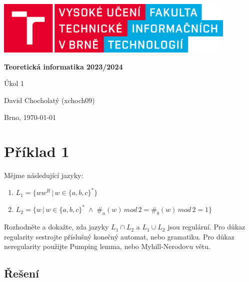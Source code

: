 \documentclass[a4paper, 12pt]{article}
\theoremstyle{definition}
\theoremstyle{definition}
\theoremstyle{definition}
\theoremstyle{remark}
\begin{document}
    \begin{titlepage}
        \begin{center}
            \includegraphics[width=0.87\textwidth]{logo_cz.png}
            \vspace*{6cm}

            \Huge{\textbf{Teoretická informatika 2023/2024}}
            \vspace{0.5cm}
            
            \LARGE{Úkol 1}
            \vspace{1cm}
            
            \Large{David Chocholatý (xchoch09)}
            
           \vfill
		   \begin{flushright} 
		   Brno, \today
		   \end{flushright}
        \end{center}
    \end{titlepage}

\pagestyle{fancy}

\section{Příklad 1}
Mějme následující jazyky:

\begin{enumerate}[label=(\alph*)]
    \item $L_1 = \{ww^R \, | \, w \in \{a,b,c\}^\ast\}$
    \item $L_2 = \{w \, | \, w \in \{a,b,c\}^\ast \; \wedge \; \#_a(w) \, mod \, 2 = \#_b(w) \, mod \, 2 = 1\}$
\end{enumerate}

Rozhodněte a dokažte, zda jazyky $L_1 \cap L_2$ a $L_1 \cup L_2$ jsou regulární. Pro důkaz regularity sestrojte příslušný konečný automat, nebo gramatiku. Pro důkaz neregularity použijte Pumping lemma, nebo Myhill-Nerodovu větu. 

\subsection{Řešení}
\end{document}
